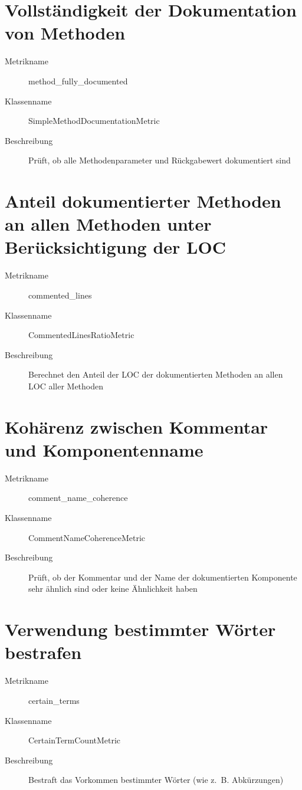 \begin{appendices}
\section{Vollständigkeit der Dokumentation von Methoden}
\begin{description}
    \item [Metrikname]  method\_fully\_documented
    \item [Klassenname] SimpleMethodDocumentationMetric
    \item[Beschreibung] Prüft, ob alle Methodenparameter und Rückgabewert dokumentiert sind
\end{description}

\section{Anteil dokumentierter Methoden an allen Methoden unter
Berücksichtigung der LOC}
\begin{description}
    \item [Metrikname]  commented\_lines
    \item [Klassenname] CommentedLinesRatioMetric
    \item[Beschreibung]  Berechnet den Anteil der \ac{LOC} der dokumentierten Methoden an allen \ac{LOC} aller Methoden
\end{description}

\section{Kohärenz zwischen Kommentar und
Komponentenname}
\begin{description}
    \item [Metrikname]  comment\_name\_coherence
    \item [Klassenname] CommentNameCoherenceMetric
    \item[Beschreibung]  Prüft, ob der Kommentar und der Name der dokumentierten Komponente sehr ähnlich sind oder keine Ähnlichkeit haben
\end{description}

\section{Verwendung bestimmter Wörter bestrafen}
\begin{description}
    \item [Metrikname]  certain\_terms
    \item [Klassenname] CertainTermCountMetric
    \item[Beschreibung]  Bestraft das Vorkommen bestimmter Wörter (wie z.~B. Abkürzungen)
\end{description}


\end{appendices}
